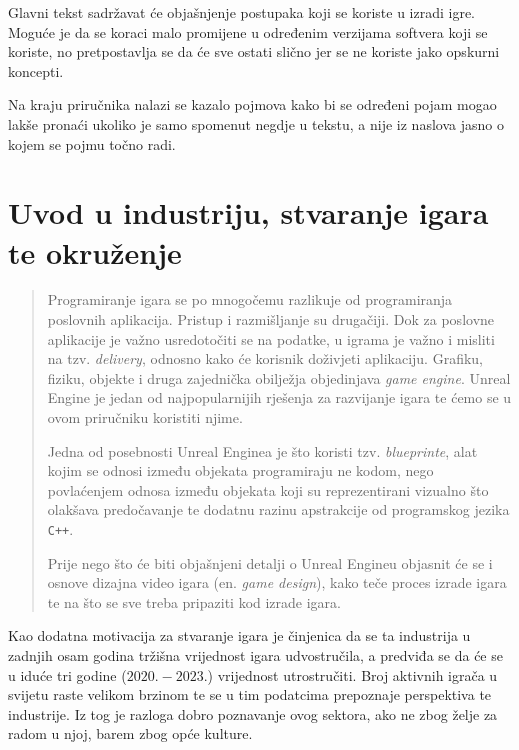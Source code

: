 \documentclass[a4paper,10pt]{article}
\begin{document}
\marginpar{\color{teal}{Dodatna objašnjenja mogu se vidjeti izdvojena sa strane
kako bi se dodatno povezalo objašnjeno s drugim konceptima.}}
Glavni tekst sadržavat će objašnjenje postupaka koji se koriste u izradi igre.
Moguće je da se koraci malo promijene u određenim verzijama softvera koji se
koriste, no pretpostavlja se da će sve ostati slično jer se ne koriste jako
opskurni koncepti.

Na kraju priručnika nalazi se kazalo pojmova kako bi se određeni pojam mogao
lakše pronaći ukoliko je samo spomenut negdje u tekstu, a nije iz naslova jasno
o kojem se pojmu točno radi.

\pagebreak

\section{Uvod u industriju, stvaranje igara te okruženje}

\begin{quote}
	\small
	Programiranje igara se po mnogočemu razlikuje od programiranja
	poslovnih aplikacija. Pristup i razmišljanje su drugačiji. Dok za
	poslovne aplikacije je važno usredotočiti se na podatke, u igrama je
	važno i misliti na tzv. \textit{delivery}, odnosno kako će korisnik
	doživjeti aplikaciju. Grafiku, fiziku, objekte i druga zajednička
	obilježja objedinjava \textit{game engine}. Unreal Engine je jedan od
	najpopularnijih rješenja za razvijanje igara te ćemo se u ovom
	priručniku koristiti njime.

	Jedna od posebnosti Unreal Enginea je što koristi tzv.
	\textit{blueprinte}, alat kojim se odnosi između objekata programiraju
	ne kodom, nego povlaćenjem odnosa između objekata koji su
	reprezentirani vizualno što olakšava predočavanje te dodatnu razinu
	apstrakcije od programskog jezika \texttt{C++}.

	Prije nego što će biti objašnjeni detalji o Unreal Engineu objasnit će
	se i osnove dizajna video igara (en. \textit{game design}), kako teče
	proces izrade igara te na što se sve treba pripaziti kod izrade igara.
\end{quote}

Kao dodatna motivacija za stvaranje igara je činjenica da se ta industrija u
zadnjih osam godina tržišna vrijednost igara udvostručila, a predviđa se da će
se u iduće tri godine ($2020.-2023.$) vrijednost utrostručiti. Broj aktivnih
igrača u svijetu raste velikom brzinom te se u tim podatcima prepoznaje
perspektiva te industrije. Iz tog je razloga dobro poznavanje ovog sektora, ako
ne zbog želje za radom u njoj, barem zbog opće kulture.
\end{document}
